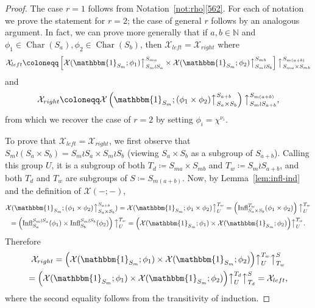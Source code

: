 \documentclass[ALCO, Unicode]{cedram}
\newcommand{\triv}{\mathbbm{1}}
\newcommand{\Ch}{\operatorname{Char}}
\newcommand{\Infl}{\operatorname{Infl}}
\newcommand{\up}{\big\uparrow}
\newcommand{\cX}{\mathcal{X}}
\newcommand{\N}{\mathbb{N}}
\begin{document}
\begin{proof}
	The case $r=1$ follows from Notation~\ref{not:rho}\ref{562}. For each of notation we prove the statement for $r=2$; the case of general $r$ follows by an analogous argument. In fact, we can prove more generally that if $a,b\in\N$ and $\phi_1\in\Ch(S_a), \phi_2\in\Ch(S_b)$, then $\cX_{left}=\cX_{right}$ where
	\[ \cX_{left}\coloneqq  \left[\cX(\triv_{S_m}; \phi_1)\up_{S_m\wr S_a}^{S_{ma}} \times \cX(\triv_{S_m}; \phi_2)\up_{S_m\wr S_b}^{S_{mb}}\right]\up_{S_{ma}\times S_{mb}}^{S_{m(a+b)}} \]
	and
	\[ \cX_{right}\coloneqq  \cX\left(\triv_{S_m}; (\phi_1\times \phi_2)\up_{S_a\times S_b}^{S_{a+b}}\right)\up_{S_m\wr S_{a+b}}^{S_{m(a+b)}}, \]
	from which we recover the case of $r=2$ by setting $\phi_i=\chi^{\nu_i}$. 
	
	To prove that $\cX_{left}=\cX_{right}$, we first observe that $S_m\wr(S_a\times S_b) = S_m\wr S_a \times S_m\wr S_b$ (viewing $S_a\times S_b$ as a subgroup of $S_{a+b}$). Calling this group $U$, it is a subgroup of both $T_d\coloneqq S_{ma}\times S_{mb}$ and $T_w\coloneqq S_m\wr S_{a+b}$, and both $T_d$ and $T_w$ are subgroups of $S\coloneqq S_{m(a+b)}$. Now, by Lemma~\ref{lem:infl-ind} and the definition of $\cX(-;-)$,
	\begin{multline*}
		\cX(\triv_{S_m}; (\phi_1 \times \phi_2)\up_{S_a\times S_b}^{S_{a+b}}) = \cX(\triv_{S_m}; \phi_1\times\phi_2)\up_U^{T_w} = \left(\Infl_{S_a\times S_b}^{T_w}(\phi_1\times\phi_2)\right)\up_U^{T_w}\\
		= \left( \Infl_{S_a}^{S_m\wr S_a}(\phi_1)\times \Infl_{S_b}^{S_m\wr S_b}(\phi_2) \right)\up_U^{T_w} = \Big( \cX(\triv_{S_m};\phi_1)\times \cX(\triv_{S_m};\phi_2) \Big)\up_U^{T_w}.
	\end{multline*}
	Therefore
	\begin{multline*}
	 	\cX_{right} = \Big( \cX(\triv_{S_m};\phi_1)\times \cX(\triv_{S_m};\phi_2) \Big)\up_U^{T_w} \up_{T_w}^S \\
	 	= \Big( \cX(\triv_{S_m};\phi_1)\times \cX(\triv_{S_m};\phi_2) \Big)\up_U^{T_d} \up_{T_d}^S = \cX_{left},
	 \end{multline*}
	where the second equality follows from the transitivity of induction.
\end{proof}
\end{document}
